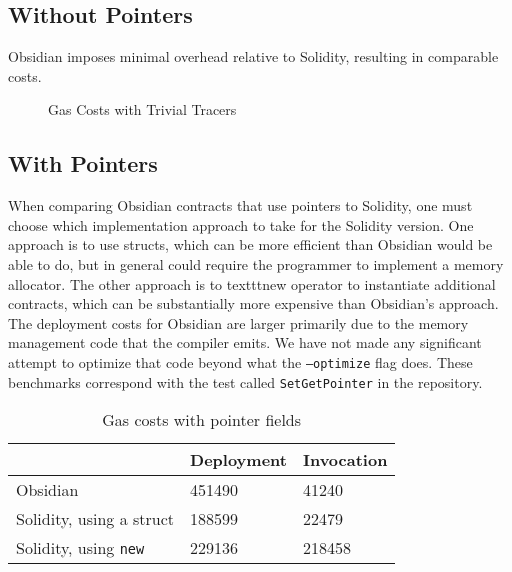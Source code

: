 \subsection{Without Pointers}

Obsidian imposes minimal overhead relative to Solidity, resulting in comparable costs.

\begin{figure}[hbtp]
    \caption{Gas Costs with Trivial Tracers}
    \label{data.1}
\end{figure}


\subsection{With Pointers}

When comparing Obsidian contracts that use pointers to Solidity, one must choose which implementation approach to take for the Solidity version. One approach is to use structs, which can be more efficient than Obsidian would be able to do, but in general could require the programmer to implement a memory allocator. The other approach is to texttt{new} operator to instantiate additional contracts, which can be substantially more expensive than Obsidian's approach. The deployment costs for Obsidian are larger primarily due to the memory management code that the compiler emits. We have not made any significant attempt to optimize that code beyond what the \texttt{--optimize} flag does. These benchmarks correspond with the test called \texttt{SetGetPointer} in the repository.

\begin{table}
\caption{Gas costs with pointer fields}
\begin{tabular}{lll}
\toprule
	 & Deployment & Invocation \\
	 \midrule
Obsidian & 451490 & 41240 \\
Solidity, using a struct & 188599 & 22479 \\
Solidity, using \texttt{new} & 229136 & 218458 \\
\bottomrule
\end{tabular}
\end{table}




